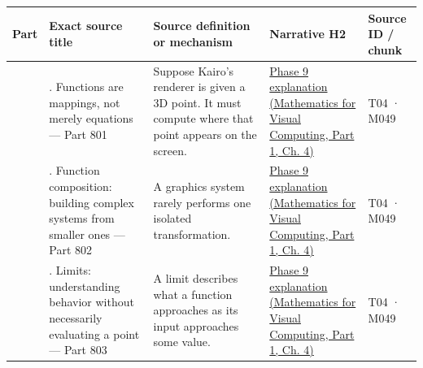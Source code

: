 {\def\LTcaptype{none} %
\begin{longtable}[]{@{}
  >{\raggedleft\arraybackslash}p{}
  >{\raggedright\arraybackslash}p{}
  >{\raggedright\arraybackslash}p{}
  >{\raggedright\arraybackslash}p{}
  >{\raggedright\arraybackslash}p{}@{}}
\toprule\noalign{}
\begin{minipage}[b]{\linewidth}\raggedleft
Part
\end{minipage} & \begin{minipage}[b]{\linewidth}\raggedright
Exact source title
\end{minipage} & \begin{minipage}[b]{\linewidth}\raggedright
Source definition or mechanism
\end{minipage} & \begin{minipage}[b]{\linewidth}\raggedright
Narrative H2
\end{minipage} & \begin{minipage}[b]{\linewidth}\raggedright
Source ID / chunk
\end{minipage} \\
\midrule\noalign{}
\endhead
\bottomrule\noalign{}
\endlastfoot
801 & 1. Functions are mappings, not merely equations --- Part 801 & Suppose Kairo's renderer is given a 3D point. It must compute where that point appears on the screen. & \href{../02-Mathematics-for-Visual-Computing-P01/main.pdf\#01-foundations-i-ch020-functions-limits-continuity-and-scalar-change}{Phase 9 explanation (Mathematics for Visual Computing, Part 1, Ch. 4)} & T04 · M049 \\
802 & 2. Function composition: building complex systems from smaller ones --- Part 802 & A graphics system rarely performs one isolated transformation. & \href{../02-Mathematics-for-Visual-Computing-P01/main.pdf\#01-foundations-i-ch020-functions-limits-continuity-and-scalar-change}{Phase 9 explanation (Mathematics for Visual Computing, Part 1, Ch. 4)} & T04 · M049 \\
803 & 3. Limits: understanding behavior without necessarily evaluating a point --- Part 803 & A limit describes what a function approaches as its input approaches some value. & \href{../02-Mathematics-for-Visual-Computing-P01/main.pdf\#01-foundations-i-ch020-functions-limits-continuity-and-scalar-change}{Phase 9 explanation (Mathematics for Visual Computing, Part 1, Ch. 4)} & T04 · M049 \\

\end{longtable}}

